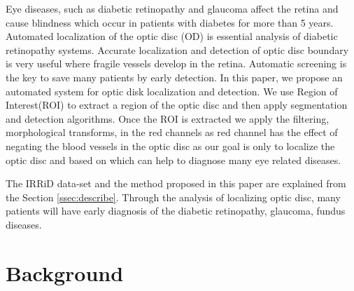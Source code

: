\documentclass[conference]{IEEEtran}
\begin{document}
Eye diseases, such as diabetic retinopathy and glaucoma affect the retina and cause blindness which occur in patients with diabetes for more than 5 years. Automated localization of the optic disc (OD) is essential analysis of diabetic retinopathy systems. Accurate localization and detection of optic disc boundary is very useful where fragile vessels develop in the retina. Automatic screening is the key to save many patients by early detection. In this paper, we propose an automated system for optic disk localization and detection. We use Region of Interest(ROI) to extract a region of the optic disc and then apply segmentation and detection algorithms. Once the ROI is extracted we apply the filtering, morphological transforms, in the red channels as red channel has the effect of negating the blood vessels in the optic disc as our goal is only to localize the optic disc and based on which can help to diagnose many eye related diseases.
\par
 The IRRiD data-set \cite{idrid} and the method proposed in this paper are explained from the Section \ref{ssec:describe}. Through the analysis of localizing optic disc, many patients will have early diagnosis of the diabetic retinopathy, glaucoma, fundus diseases.

\section{Background}
\par
\end{document}
